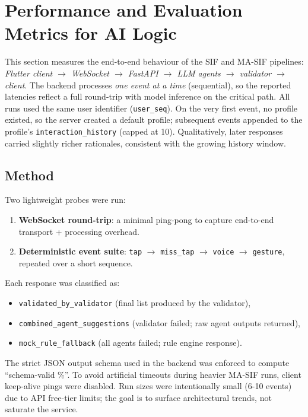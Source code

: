 \documentclass[openany]{book}
\begin{document}
\section{Performance and Evaluation Metrics for AI Logic}
\label{sec:perf-metrics-ai-logic}

This section measures the end-to-end behaviour of the SIF and MA\mbox{-}SIF pipelines:
\emph{Flutter client $\rightarrow$ WebSocket $\rightarrow$ FastAPI $\rightarrow$ LLM agents $\rightarrow$ validator $\rightarrow$ client}.
The backend processes \emph{one event at a time} (sequential), so the reported latencies reflect a full round-trip with model inference on the critical path.  
All runs used the same user identifier (\texttt{user\_seq}). On the very first event, no profile existed, so the server created a default profile; subsequent events appended to the profile’s \texttt{interaction\_history} (capped at 10). Qualitatively, later responses carried slightly richer rationales, consistent with the growing history window.

\subsection*{Method}
Two lightweight probes were run:
\begin{enumerate}
    \item \textbf{WebSocket round-trip}: a minimal ping-pong to capture end-to-end transport + processing overhead.
    \item \textbf{Deterministic event suite}: \texttt{tap} $\rightarrow$ \texttt{miss\_tap} $\rightarrow$ \texttt{voice} $\rightarrow$ \texttt{gesture}, repeated over a short sequence.
\end{enumerate}
Each response was classified as:
\begin{itemize}
    \item \texttt{validated\_by\_validator} (final list produced by the validator),
    \item \texttt{combined\_agent\_suggestions} (validator failed; raw agent outputs returned),
    \item \texttt{mock\_rule\_fallback} (all agents failed; rule engine response).
\end{itemize}
The strict JSON output schema used in the backend was enforced to compute “schema-valid \%”. To avoid artificial timeouts during heavier MA-SIF runs, client keep-alive pings were disabled. Run sizes were intentionally small (6-10 events) due to API free-tier limits; the goal is to surface architectural trends, not saturate the service.
\end{document}
